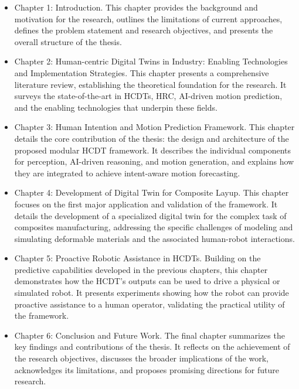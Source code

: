 \begin{itemize}
    \item Chapter 1: Introduction. This chapter provides the background and motivation for the research, outlines the limitations of current approaches, defines the problem statement and research objectives, and presents the overall structure of the thesis.

    \item Chapter 2: Human-centric Digital Twins in Industry: Enabling Technologies and Implementation Strategies. This chapter presents a comprehensive literature review, establishing the theoretical foundation for the research. It surveys the state-of-the-art in HCDTs, HRC, AI-driven motion prediction, and the enabling technologies that underpin these fields.

    \item Chapter 3: Human Intention and Motion Prediction Framework. This chapter details the core contribution of the thesis: the design and architecture of the proposed modular HCDT framework. It describes the individual components for perception, AI-driven reasoning, and motion generation, and explains how they are integrated to achieve intent-aware motion forecasting.

    \item Chapter 4: Development of Digital Twin for Composite Layup. This chapter focuses on the first major application and validation of the framework. It details the development of a specialized digital twin for the complex task of composites manufacturing, addressing the specific challenges of modeling and simulating deformable materials and the associated human-robot interactions.

    \item Chapter 5: Proactive Robotic Assistance in HCDTs. Building on the predictive capabilities developed in the previous chapters, this chapter demonstrates how the HCDT's outputs can be used to drive a physical or simulated robot. It presents experiments showing how the robot can provide proactive assistance to a human operator, validating the practical utility of the framework.

    \item Chapter 6: Conclusion and Future Work. The final chapter summarizes the key findings and contributions of the thesis. It reflects on the achievement of the research objectives, discusses the broader implications of the work, acknowledges its limitations, and proposes promising directions for future research.
\end{itemize}